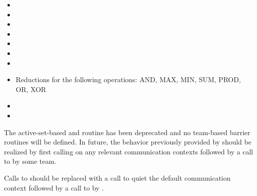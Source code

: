 \begin{DeprecateBlock}
\begin{itemize}
\item {}
\item {}
\item {}
\item {}
\item {}
\item {}
\item {}
\item Reductions for the following operations: AND, MAX, MIN, SUM, PROD, OR, XOR
\item {}
\item {}
\end{itemize}

{\color{Green}
The active-set-based  and routine has been deprecated and
no team-based barrier routines will be defined. In future, the behavior
previously provided by  should be realized by first calling
 on any relevant communication contexts followed by a call
to  by some \openshmem team.

Calls to 
should be replaced with a call to quiet the default communication context followed
by a call to  by .
}
\end{DeprecateBlock}
